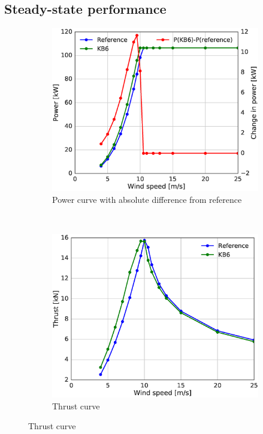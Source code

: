 \subsection{Steady-state performance}

\begin{figure}[tph]
\begin{subfigure}{0.50\textwidth}
\includegraphics[width=\linewidth]{figures/KB6_final/KB6_power_diff_HS2.eps}
\caption{Power curve with absolute difference from reference}
\label{subfig:KB6_pcurve}
\end{subfigure}
 ~
\begin{subfigure}{0.50\textwidth}
\includegraphics[width=\linewidth]{figures/KB6_final/KB6_thrust_HS2.eps}
\caption{Thrust curve}
\label{subfig:KB6_thrust}
\end{subfigure}


\end{figure}
